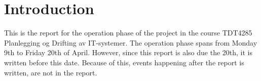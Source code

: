 \section{Introduction}
This is the report for the operation phase of the project in the course
TDT4285 Planlegging og Drifting av IT-systemer. The operation phase
spans from Monday 9th to Friday 20th of April. However, since this
report is also due the 20th, it is written before this date. Because of
this, events happening after the report is written, are not in the
report. 
